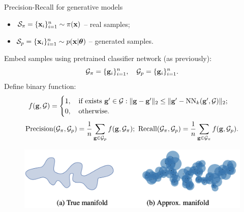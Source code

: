 \begin{frame}{Precision-Recall for generative models}
	\begin{itemize}
		\item $\mathcal{S}_{\pi} = \{\mathbf{x}_i\}_{i=1}^{n} \sim \pi(\mathbf{x})$ -- real samples;
		\item $\mathcal{S}_{p} = \{\mathbf{x}_i\}_{i=1}^{n} \sim p(\mathbf{x} | \boldsymbol{\theta})$ -- generated samples.
	\end{itemize}
	Embed samples using pretrained classifier network (as previously):
	\[
		\mathcal{G}_{\pi} = \{\mathbf{g}_i\}_{i=1}^n, \quad \mathcal{G}_{p} = \{\mathbf{g}_i\}_{i=1}^n.
	\]
	Define binary function:
	\[
		f(\mathbf{g}, \mathcal{G}) = 
		\begin{cases}
			1, \quad \text{if exists } \mathbf{g}' \in \mathcal{G}: \| \mathbf{g}  - \mathbf{g}'\|_2 \leq \| \mathbf{g}' - \text{NN}_k(\mathbf{g}', \mathcal{G})\|_2; \\
			0, \quad \text{otherwise.}
		\end{cases}
	\]
	\[
		\text{Precision} (\mathcal{G}_{\pi}, \mathcal{G}_{p}) = \frac{1}{n} \sum_{\mathbf{g} \in \mathcal{G}_{p}} f(\mathbf{g}, \mathcal{G}_{\pi}); \,\, \text{Recall} (\mathcal{G}_{\pi}, \mathcal{G}_{p}) = \frac{1}{n} \sum_{\mathbf{g} \in \mathcal{G}_{\pi}} f(\mathbf{g}, \mathcal{G}_{p}).
	\]
	\vspace{-0.4cm}
	\begin{figure}
		\includegraphics[width=0.7\linewidth]{figs/pr_k_nearest}
	\end{figure}
\end{frame}
